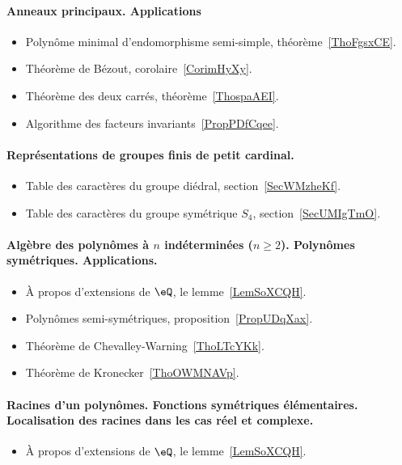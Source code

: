 \paragraph{Anneaux principaux. Applications}
\begin{itemize}
    \item Polynôme minimal d'endomorphisme semi-simple, théorème~\ref{ThoFgsxCE}.
    \item Théorème de Bézout, corolaire~\ref{CorimHyXy}.
    \item Théorème des deux carrés, théorème~\ref{ThospaAEI}.
    \item Algorithme des facteurs invariants~\ref{PropPDfCqee}.
\end{itemize}
\paragraph{Représentations de groupes finis de petit cardinal.}
\begin{itemize}
    \item Table des caractères du groupe diédral, section~\ref{SecWMzheKf}.
    \item Table des caractères du groupe symétrique \( S_4\), section~\ref{SecUMIgTmO}.
\end{itemize}
\paragraph{Algèbre des polynômes à \( n\) indéterminées (\( n\geq 2\)). Polynômes symétriques. Applications.}
\begin{itemize}
    \item À propos d'extensions de \( \eQ\), le lemme~\ref{LemSoXCQH}.
    \item Polynômes semi-symétriques, proposition~\ref{PropUDqXax}.
    \item Théorème de Chevalley-Warning~\ref{ThoLTcYKk}.
    \item Théorème de Kronecker~\ref{ThoOWMNAVp}.
\end{itemize}

\paragraph{Racines d’un polynômes. Fonctions symétriques élémentaires. Localisation des racines dans les cas réel et complexe.}
\begin{itemize}
    \item À propos d'extensions de \( \eQ\), le lemme~\ref{LemSoXCQH}.
\end{itemize}

